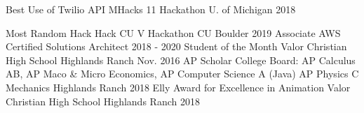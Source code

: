 

\begin{cvhonors}

  \cvhonor
    {Best Use of Twilio API} %
    {MHacks 11 Hackathon}
    {U. of Michigan} %
    {2018} %

  \cvhonor
    {Most Random Hack} %
    {Hack CU V Hackathon}
    {CU Boulder} %
    {2019} %
  \cvhonor
    {Associate} %
    {AWS Certified Solutions Architect }
    {} %
    {2018 - 2020} %
  \cvhonor
    {Student of the Month} %
    {Valor Christian High School}
    {Highlands Ranch} %
    {Nov. 2016} %
    \cvhonor
    {AP Scholar} %
    {College Board: AP Calculus AB, AP Maco \& Micro Economics, AP
      Computer Science A (Java) AP Physics C Mechanics}
    {Highlands Ranch} %
    {2018} %
    \cvhonor
    {Elly Award for Excellence in Animation} %
    {Valor Christian High School}
    {Highlands Ranch} %
    {2018} %
\end{cvhonors}

